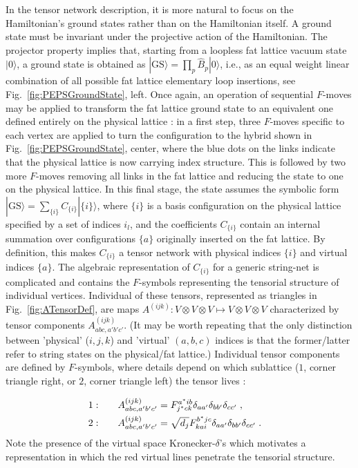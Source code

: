 \documentclass[twocolumn,floats,prx,showpacs]{revtex4-1}
\begin{document}
In the tensor network description, it is more natural to focus on the Hamiltonian's ground states rather than on the Hamiltonian itself. A ground state must be invariant under the projective action of the Hamiltonian. The projector property implies that, starting from a loopless fat lattice vacuum 
state $|0\rangle$, a ground state is obtained as $|\mathrm{GS}\rangle =\prod_p \hat B_p |0\rangle$, i.e., as an equal weight linear combination of all possible fat lattice elementary loop insertions, see Fig.~\ref{fig:PEPSGroundState}, left. Once again, an operation of sequential $F$-moves may be applied to transform the fat lattice ground state to an equivalent one defined entirely on the physical lattice \cite{Buerschaper2009,Gu2009}: in a first step, three $F$-moves specific to each vertex are applied to turn the configuration to the hybrid shown in Fig.~\ref{fig:PEPSGroundState}, center, where the blue dots on the links indicate that the physical lattice is now carrying index structure. This is followed by two more $F$-moves removing all links in the fat lattice and reducing the state to one on the physical lattice. In this final stage, the state assumes the symbolic form $|\mathrm{GS}\rangle=\sum_{\{i\}} C_{\{i\}}|\{i\}\rangle$, where $\{i\}$ is a basis configuration on the physical lattice specified by a set of indices $i_l$, and the coefficients $C_{\{i\}}$ contain an internal summation over configurations $\{a\}$ originally inserted on the fat lattice. By definition, this makes $C_{\{i\}}$ a tensor network with physical indices $\{i\}$ and virtual indices $\{a\}$. The algebraic representation of $C_{\{i\}}$ for a generic string-net is complicated and contains the  $F$-symbols representing the tensorial structure of individual vertices. Individual of these tensors, represented as triangles in Fig.~\ref{fig:ATensorDef}, are maps $A^{(ijk)}:V\otimes V\otimes V \mapsto V\otimes V\otimes V$ characterized by tensor components $A^{(ijk)}_{abc,a'b'c'}$. (It may be worth repeating that the only distinction between 'physical' ($i,j,k$) and 'virtual' $(a,b,c)$ indices is that the former/latter refer to string states on the physical/fat lattice.) Individual tensor components are defined by $F$-symbols, where  details depend on which sublattice ($1$, corner triangle right, or $2$, corner triangle left) the tensor lives \cite{Buerschaper2009,Gu2009}:

\begin{align*}
1:&\qquad A^{(ijk)}_{abc,a'b'c'}=F^{a^\ast ib}_{j^\ast c k}\delta_{aa'}
\delta_{bb'}\delta_{cc'}\;,\cr
2:&\qquad A^{(ijk)}_{abc,a'b'c'}=\sqrt{d_j}F^{b^\ast jc}_{kai}\delta_{aa'}\delta_{bb'}\delta_{cc'}\;.
\end{align*}
Note the presence of the virtual space Kronecker-$\delta$'s which motivates a representation in which the red virtual lines penetrate the tensorial structure. 
\end{document}
